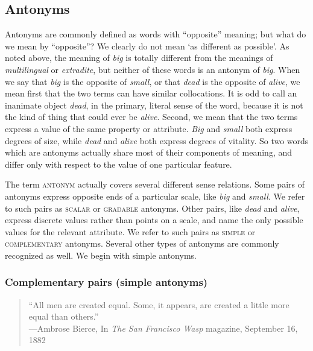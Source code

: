 \subsection{Antonyms}\label{sec:6.2.2}

Antonyms are commonly defined as words with “opposite” meaning; but what do we mean by “opposite”? We clearly do not mean ‘as different as possible’. As noted above, the meaning of \textit{big} is totally different from the meanings of \textit{multilingual} or \textit{extradite}, but neither of these words is an antonym of \textit{big}. When we say that \textit{big} is the opposite of \textit{small}, or that \textit{dead} is the opposite of \textit{alive}, we mean first that the two terms can have similar collocations. It is odd to call an inanimate object \textit{dead}, in the primary, literal sense of the word, because it is not the kind of thing that could ever be \textit{alive}. Second, we mean that the two terms express a value of the same property or attribute. \textit{Big} and \textit{small} both express degrees of size, while \textit{dead} and \textit{alive} both express degrees of vitality. So two words which are antonyms actually share most of their components of meaning, and differ only with respect to the value of one particular feature.



The term \textsc{antonym} actually covers several different sense relations. Some pairs of antonyms express opposite ends of a particular scale, like \textit{big} and \textit{small}. We refer to such pairs as \textsc{scalar} or \textsc{gradable} antonyms. Other pairs, like \textit{dead} and \textit{alive}, express discrete values rather than points on a scale, and name the only possible values for the relevant attribute. We refer to such pairs as \textsc{simple} or \textsc{complementary} antonyms. Several other types of antonyms are commonly recognized as well. We begin with simple antonyms.


\subsubsection{Complementary pairs (simple antonyms)}\label{sec:6.2.2.1}
\begin{quote}
“All men are created equal. Some, it appears, are created a little more equal than others.”\\
—Ambrose Bierce, In \textit{The San Francisco Wasp} magazine, September 16, 1882
\end{quote}


